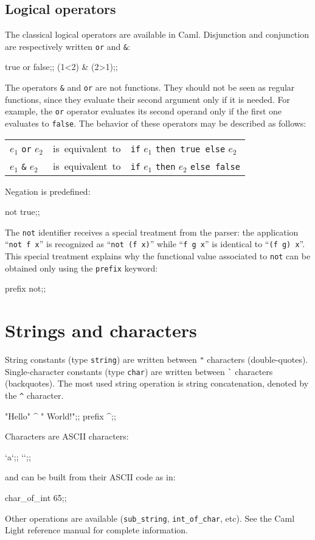 \subsection{Logical operators}

The classical logical operators are available in Caml. Disjunction and
conjunction are respectively written {\tt or} and \verb|&|:
\begin{caml_example}
true or false;;
(1<2) & (2>1);;
\end{caml_example}
The operators \verb"&" and \verb"or" are not functions. They should
not be seen as regular functions, since they evaluate their second
argument only if it is needed. For example, the \verb"or" operator
evaluates its second operand only if the first one evaluates to
\verb"false".
The behavior of these operators may be described as follows:
\begin{center}
\begin{tabular}{lcl}
$e_1$ {\tt or} $e_2$ & \mbox{is equivalent to} &
                {\tt if} $e_1$ {\tt then true  else} $e_2$\\
$e_1$ \verb"&" $e_2$ & \mbox{is equivalent to} &
                {\tt if} $e_1$ {\tt then} $e_2$ {\tt else false}
\end{tabular}
\end{center}
Negation is predefined:
\begin{caml_example}
not true;;
\end{caml_example}
The \verb|not| identifier receives a special treatment from the
parser: the application ``{\tt not f x}'' is recognized as ``{\tt not
(f x)}'' while ``{\tt f g x}'' is identical to ``{\tt (f g) x}''. This
special treatment explains why the functional value associated to {\tt not}
can be obtained only using the {\tt prefix} keyword:
\begin{caml_example}
prefix not;;
\end{caml_example}

\section{Strings and characters}

String constants (type \verb"string") are written between \verb|"|
characters (double-quotes). Single-character constants (type
\verb"char") are written between \verb|`| characters (backquotes).
The most used string operation is string concatenation, denoted by the
\verb"^" character.
\begin{caml_example}
"Hello" ^ " World!";;
prefix ^;;
\end{caml_example}
Characters are ASCII characters:
\begin{caml_example}
`a`;;
``;;
\end{caml_example}
and can be built from their ASCII code as in:
\begin{caml_example}
char_of_int 65;;
\end{caml_example}
Other operations are available (\verb"sub_string", \verb|int_of_char|,
etc). See the Caml Light reference manual \cite{CamlLightDoc} for
complete information.



